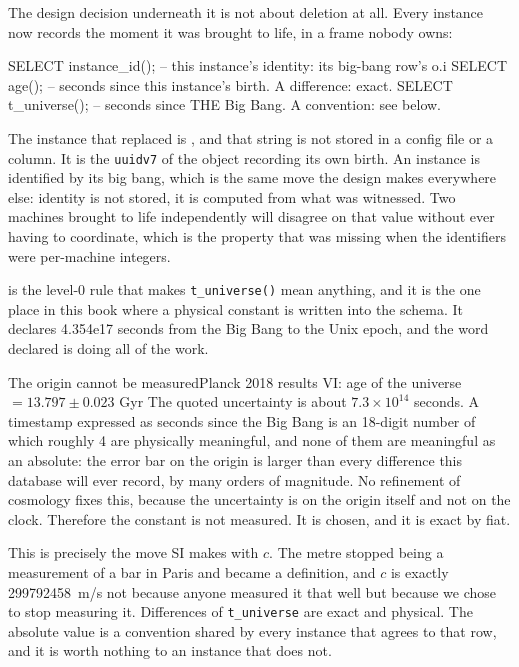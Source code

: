 The design decision underneath it is not about deletion at all. Every instance now records the moment it was brought to life, in a frame nobody owns:

\begin{Check}
SELECT instance_id();   -- this instance's identity: its big-bang row's o.i
SELECT age();           -- seconds since this instance's birth. A difference: exact.
SELECT t_universe();    -- seconds since THE Big Bang. A convention: see below.
\end{Check}

The instance that replaced \labLineageName{} is \texttt{\labLineageNewInstanceId{}}, and that string is not stored in a config file or a column. It is the \texttt{uuidv7} of the object recording its own birth. An instance is identified by its big bang, which is the same move the design makes everywhere else: identity is not stored, it is computed from what was witnessed. Two machines brought to life independently will disagree on that value without ever having to coordinate, which is the property that was missing when the identifiers were per-machine integers.

 is the level-0 rule that makes \texttt{t\_universe()} mean anything, and it is the one place in this book where a physical constant is written into the schema. It declares 4.354e17 seconds from the Big Bang to the Unix epoch, and the word declared is doing all of the work.

\begin{Theorem}{The origin cannot be measured}{Planck 2018 results VI: age of the universe $= 13.797 \pm 0.023$ Gyr}
The quoted uncertainty is about $7.3 \times 10^{14}$ seconds. A timestamp expressed as seconds since the Big Bang is an 18-digit number of which roughly 4 are physically meaningful, and none of them are meaningful as an absolute: the error bar on the origin is larger than every difference this database will ever record, by many orders of magnitude. No refinement of cosmology fixes this, because the uncertainty is on the origin itself and not on the clock. Therefore the constant is not measured. It is chosen, and it is exact by fiat.
\end{Theorem}

This is precisely the move SI makes with $c$. The metre stopped being a measurement of a bar in Paris and became a definition, and $c$ is exactly 299792458~m/s not because anyone measured it that well but because we chose to stop measuring it. Differences of \texttt{t\_universe} are exact and physical. The absolute value is a convention shared by every instance that agrees to that row, and it is worth nothing to an instance that does not.

